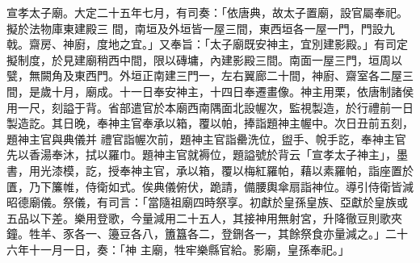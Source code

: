 \begin{pinyinscope}
 宣孝太子廟。大定二十五年七月，有司奏：「依唐典，故太子置廟，設官屬奉祀。擬於法物庫東建殿三
 間，南垣及外垣皆一屋三間，東西垣各一屋一門，門設九戟。齋房、神廚，度地之宜。」又奉旨：「太子廟既安神主，宜別建影殿。」有司定擬制度，於見建廟稍西中間，限以磚墉，內建影殿三間。南面一屋三門，垣周以甓，無闕角及東西門。外垣正南建三門一，左右翼廊二十間，神廚、齋室各二屋三間，是歲十月，廟成。十一日奉安神主，十四日奉遷畫像。神主用栗，依唐制諸侯用一尺，刻謚于背。省部遣官於本廟西南隅面北設幄次，監視製造，於行禮前一日製造訖。其日晚，奉神主官奉承以箱，覆以帕，捧詣題神主幄中。次日丑前五刻，題神主官與典儀并
 禮官詣幄次前，題神主官詣罍洗位，盥手、帨手訖，奉神主官先以香湯奉沐，拭以羅巾。題神主官就褥位，題謚號於背云「宣孝太子神主」，墨書，用光漆模，訖，授奉神主官，承以箱，覆以梅紅羅帕，藉以素羅帕，詣座置於匱，乃下簾帷，侍衛如式。俟典儀俯伏，跪請，備腰輿傘扇詣神位。導引侍衛皆減昭德廟儀。祭儀，有司言：「當隨祖廟四時祭享。初獻於皇孫皇族、亞獻於皇族或五品以下差。樂用登歌，今量減用二十五人，其接神用無射宮，升降徹豆則歌夾鐘。牲羊、豕各一、籩豆各八，簠簋各二，登鉶各一，其餘祭食亦量減之。」二十六年十一月一日，奏：「神
 主廟，牲牢樂縣官給。影廟，皇孫奉祀。」



\end{pinyinscope}